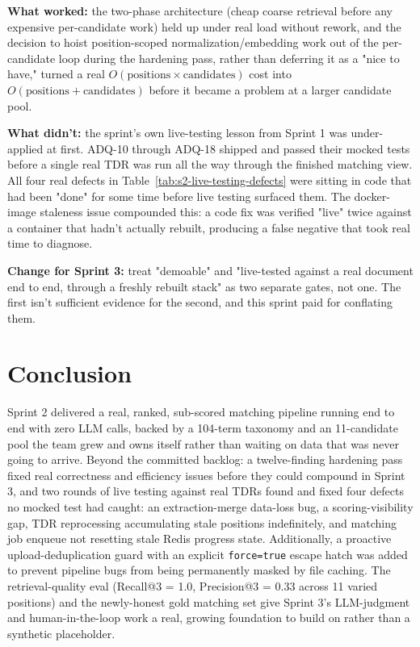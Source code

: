 \textbf{What worked:} the two-phase architecture (cheap coarse retrieval
before any expensive per-candidate work) held up under real load without
rework, and the decision to hoist position-scoped normalization/embedding
work out of the per-candidate loop during the hardening pass, rather
than deferring it as a "nice to have," turned a real
$O(\text{positions} \times \text{candidates})$ cost into
$O(\text{positions} + \text{candidates})$ before it became a problem at a
larger candidate pool.

\textbf{What didn't:} the sprint's own live-testing lesson from Sprint 1
was under-applied at first. ADQ-10 through ADQ-18 shipped and passed
their mocked tests before a single real TDR was run all the way through
the finished matching view. All four real defects in
Table~\ref{tab:s2-live-testing-defects} were sitting in code that had
been "done" for some time before live testing surfaced them. The
docker-image staleness issue
compounded this: a code fix was verified "live" twice against a
container that hadn't actually rebuilt, producing a false negative that
took real time to diagnose.

\textbf{Change for Sprint 3:} treat "demoable" and "live-tested against a
real document end to end, through a freshly rebuilt stack" as two
separate gates, not one. The first isn't sufficient evidence for the
second, and this sprint paid for conflating them.

\section{Conclusion}

Sprint 2 delivered a real, ranked, sub-scored matching pipeline running
end to end with zero LLM calls, backed by a 104-term taxonomy and an
11-candidate pool the team grew and owns itself rather than waiting on
data that was never going to arrive. Beyond the committed backlog: a
twelve-finding hardening pass fixed real correctness and efficiency
issues before they could compound in Sprint 3, and two rounds of live
testing against real TDRs found and fixed four defects no mocked test had
caught: an extraction-merge data-loss bug, a scoring-visibility gap, TDR
reprocessing accumulating stale positions indefinitely, and matching job
enqueue not resetting stale Redis progress state. Additionally, a proactive
upload-deduplication guard with an explicit \texttt{force=true} escape hatch
was added to prevent pipeline bugs from being permanently masked by file
caching. The retrieval-quality eval (Recall@3 = 1.0, Precision@3 = 0.33 across
11 varied positions) and the newly-honest gold matching set give Sprint 3's
LLM-judgment and human-in-the-loop work a real, growing foundation to build
on rather than a synthetic placeholder.

